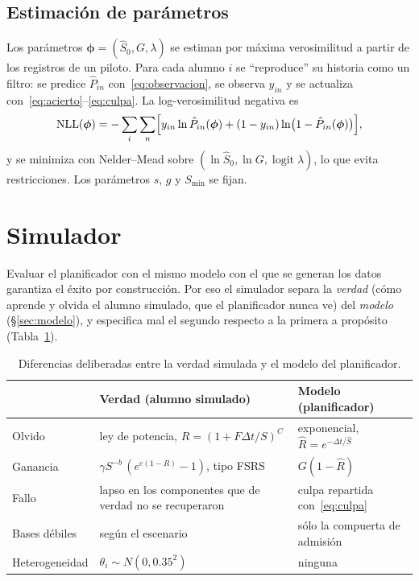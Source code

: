 \documentclass[11pt]{article}
\theoremstyle{definition}
\theoremstyle{remark}
\newcommand{\Rh}{\hat R}
\newcommand{\Sh}{\hat S}
\newcommand{\Smin}{S_{\min}}
\begin{document}
\subsection{Estimación de parámetros}

Los parámetros $\bm\phi=(\Sh_0,G,\lambda)$ se estiman por máxima verosimilitud a partir de los registros de un piloto. Para cada alumno $i$ se ``reproduce'' su historia como un filtro: se predice $\hat P_{in}$ con~\eqref{eq:observacion}, se observa $y_{in}$ y se actualiza con~\eqref{eq:acierto}--\eqref{eq:culpa}. La log-verosimilitud negativa es
\begin{equation}
\mathrm{NLL}(\bm\phi)=-\sum_i\sum_n\Bigl[y_{in}\ln\hat P_{in}(\bm\phi)+(1-y_{in})\ln\bigl(1-\hat P_{in}(\bm\phi)\bigr)\Bigr],
\label{eq:nll}
\end{equation}
y se minimiza con Nelder--Mead sobre $(\ln\Sh_0,\ln G,\operatorname{logit}\lambda)$, lo que evita restricciones. Los parámetros $s$, $g$ y $\Smin$ se fijan.

\section{Simulador}
\label{sec:simulador}

Evaluar el planificador con el mismo modelo con el que se generan los datos garantiza el éxito por construcción. Por eso el simulador separa la \emph{verdad} (cómo aprende y olvida el alumno simulado, que el planificador nunca ve) del \emph{modelo} (\S\ref{sec:modelo}), y especifica mal el segundo respecto a la primera a propósito (Tabla~\ref{tab:verdad-modelo}).

\begin{table}[t]
\centering\small
\caption{Diferencias deliberadas entre la verdad simulada y el modelo del planificador.}
\label{tab:verdad-modelo}
\begin{tabularx}{\textwidth}{lXX}
\toprule
& Verdad (alumno simulado) & Modelo (planificador) \\
\midrule
Olvido & ley de potencia, $R=(1+F\Delta t/S)^{C}$ & exponencial, $\Rh=e^{-\Delta t/\Sh}$ \\
Ganancia & $\gamma S^{-b}\,(e^{c(1-R)}-1)$, tipo FSRS & $G(1-\Rh)$ \\
Fallo & lapso en los componentes que de verdad no se recuperaron & culpa repartida con~\eqref{eq:culpa} \\
Bases débiles & según el escenario & sólo la compuerta de admisión \\
Heterogeneidad & $\theta_i\sim N(0,0.35^2)$ & ninguna \\
\bottomrule
\end{tabularx}
\end{table}
\end{document}
